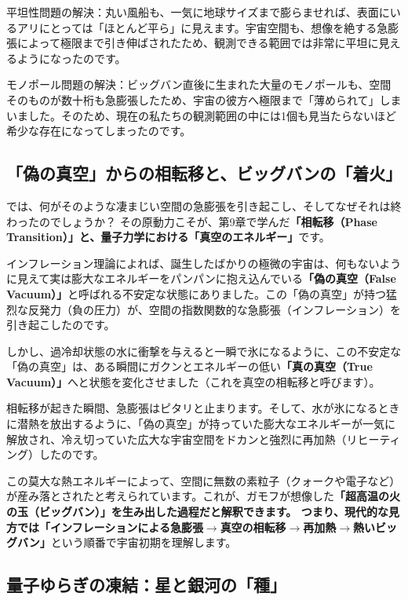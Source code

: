平坦性問題の解決：丸い風船も、一気に地球サイズまで膨らませれば、表面にいるアリにとっては「ほとんど平ら」に見えます。宇宙空間も、想像を絶する急膨張によって極限まで引き伸ばされたため、観測できる範囲では非常に平坦に見えるようになったのです。

モノポール問題の解決：ビッグバン直後に生まれた大量のモノポールも、空間そのものが数十桁も急膨張したため、宇宙の彼方へ極限まで「薄められて」しまいました。そのため、現在の私たちの観測範囲の中には1個も見当たらないほど希少な存在になってしまったのです。

\subsection{「偽の真空」からの相転移と、ビッグバンの「着火」}

では、何がそのような凄まじい空間の急膨張を引き起こし、そしてなぜそれは終わったのでしょうか？ その原動力こそが、第9章で学んだ\textbf{「相転移（Phase Transition）」と、量子力学における「真空のエネルギー」}です。

インフレーション理論によれば、誕生したばかりの極微の宇宙は、何もないように見えて実は膨大なエネルギーをパンパンに抱え込んでいる\textbf{「偽の真空（False Vacuum）」}と呼ばれる不安定な状態にありました。この「偽の真空」が持つ猛烈な反発力（負の圧力）が、空間の指数関数的な急膨張（インフレーション）を引き起こしたのです。

しかし、過冷却状態の水に衝撃を与えると一瞬で氷になるように、この不安定な「偽の真空」は、ある瞬間にガクンとエネルギーの低い\textbf{「真の真空（True Vacuum）」}へと状態を変化させました（これを真空の相転移と呼びます）。

相転移が起きた瞬間、急膨張はピタリと止まります。そして、水が氷になるときに潜熱を放出するように、「偽の真空」が持っていた膨大なエネルギーが一気に解放され、冷え切っていた広大な宇宙空間をドカンと強烈に再加熱（リヒーティング）したのです。

この莫大な熱エネルギーによって、空間に無数の素粒子（クォークや電子など）が産み落とされたと考えられています。これが、ガモフが想像した\textbf{「超高温の火の玉（ビッグバン）」を生み出した過程だと解釈できます。 つまり、現代的な見方では「インフレーションによる急膨張\(\to\)真空の相転移\(\to\)再加熱\(\to\)熱いビッグバン」}という順番で宇宙初期を理解します。

\subsection{量子ゆらぎの凍結：星と銀河の「種」}

